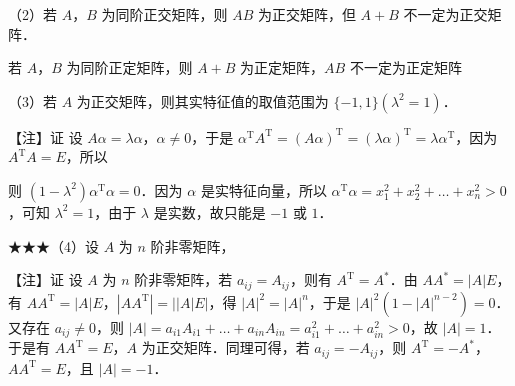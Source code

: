 （2）若 $A$，$B$ 为同阶正交矩阵，则 $AB$ 为正交矩阵，但 $A+B$ 不一定为正交矩阵．

\begin{fnote}
若 $A$，$B$ 为同阶正定矩阵，则 $A+B$ 为正定矩阵，$AB$ 不一定为正定矩阵
\end{fnote}

（3）若 $A$ 为正交矩阵，则其实特征值的取值范围为 $\{-1,1\}$\quad $(\lambda^2=1)$．

【注】证 设 $A\alpha=\lambda\alpha$，$\alpha\ne0$，于是 $\alpha^{\mathrm T}A^{\mathrm T}=(A\alpha)^{\mathrm T}=(\lambda\alpha)^{\mathrm T}=\lambda\alpha^{\mathrm T}$，因为 $A^{\mathrm T}A=E$，所以


则 $(1-\lambda^2)\alpha^{\mathrm T}\alpha=0$．因为 $\alpha$ 是实特征向量，所以 $\alpha^{\mathrm T}\alpha=x_1^2+x_2^2+\dots+x_n^2>0$，可知 $\lambda^2=1$，由于 $\lambda$ 是实数，故只能是 $-1$ 或 $1$．

★★★（4）设 $A$ 为 $n$ 阶非零矩阵，



【注】证 设 $A$ 为 $n$ 阶非零矩阵，若 $a_{ij}=A_{ij}$，则有 $A^{\mathrm T}=A^{*}$．由 $AA^{*}=|A|E$，有 $AA^{\mathrm T}=|A|E$，$|AA^{\mathrm T}|=\bigl||A|E\bigr|$，得 $|A|^2=|A|^n$，于是 $|A|^2(1-|A|^{n-2})=0$．又存在 $a_{ij}\ne0$，则 $|A|=a_{i1}A_{i1}+\dots+a_{in}A_{in}=a_{i1}^2+\dots+a_{in}^2>0$，故 $|A|=1$．于是有 $AA^{\mathrm T}=E$，$A$ 为正交矩阵．同理可得，若 $a_{ij}=-A_{ij}$，则 $A^{\mathrm T}=-A^{*}$，$AA^{\mathrm T}=E$，且 $|A|=-1$．


